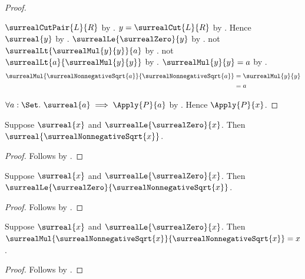 \begin{proof}
\begin{subproof}
\begin{subproof}
            $\surrealCutPair{L}{R}$
                by .
            $y=\surrealCut{L}{R}$
                by .
            Hence $\surreal{y}$
                by .
            $\surrealLe{\surrealZero}{y}$
                by .
            not $\surrealLt{\surrealMul{y}{y}}{a}$
                by .
            not $\surrealLt{a}{\surrealMul{y}{y}}$
                by .
            $\surrealMul{y}{y}=a$
                by
                .
            \begin{align*}
                \surrealMul{\surrealNonnegativeSqrt{a}}{
                    \surrealNonnegativeSqrt{a}}
                    &= \surrealMul{y}{y} \\
                    &= a
            \end{align*}
        \end{subproof}
    \end{subproof}
    $\forall a:\Set.\ \surreal{a}\implies\Apply{P}{a}$
        by .
    Hence $\Apply{P}{x}$.
\end{proof}

\begin{corollary}\label{surreal_nonnegative_sqrt_is_surreal}
    Suppose $\surreal{x}$ and
        $\surrealLe{\surrealZero}{x}$.
    Then $\surreal{\surrealNonnegativeSqrt{x}}$.
\end{corollary}
\begin{proof}
    Follows by .
\end{proof}

\begin{corollary}\label{surreal_nonnegative_sqrt_nonnegative}
    Suppose $\surreal{x}$ and
        $\surrealLe{\surrealZero}{x}$.
    Then $\surrealLe{\surrealZero}{\surrealNonnegativeSqrt{x}}$.
\end{corollary}
\begin{proof}
    Follows by .
\end{proof}

\begin{corollary}\label{surreal_nonnegative_sqrt_square}
    Suppose $\surreal{x}$ and
        $\surrealLe{\surrealZero}{x}$.
    Then $\surrealMul{\surrealNonnegativeSqrt{x}}{
        \surrealNonnegativeSqrt{x}}=x$.
\end{corollary}
\begin{proof}
    Follows by .
\end{proof}

